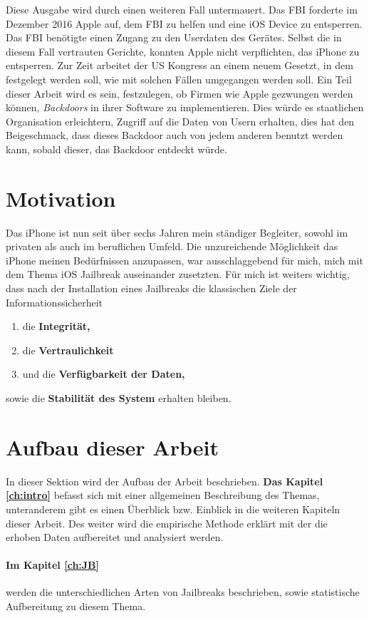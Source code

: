 Diese Ausgabe wird durch einen weiteren Fall untermauert. Das FBI forderte im Dezember 2016 Apple auf, dem FBI zu helfen und eine iOS Device zu entsperren. Das FBI benötigte einen Zugang zu den Userdaten des Gerätes. Selbst die in diesem Fall vertrauten Gerichte, konnten Apple nicht verpflichten, das iPhone zu entsperren. Zur Zeit arbeitet der US Kongress an einem neuem Gesetzt, in dem festgelegt werden soll, wie mit solchen Fällen umgegangen werden soll. Ein Teil dieser Arbeit wird es sein, festzulegen, ob Firmen wie Apple gezwungen werden können, \textit{\glqq Backdoors\grqq{}} in ihrer Software zu implementieren. Dies würde es staatlichen Organisation erleichtern, Zugriff auf die Daten von Usern erhalten, dies hat den Beigeschmack, dass dieses Backdoor auch von jedem anderen benutzt werden kann, sobald dieser, das Backdoor entdeckt würde. 

\section{Motivation }
\label{sec:IntroMotivation}
Das iPhone ist nun seit über sechs Jahren mein ständiger Begleiter, sowohl im privaten als auch im beruflichen Umfeld. Die unzureichende Möglichkeit das iPhone meinen Bedürfnissen anzupassen, war ausschlaggebend für mich, mich mit dem Thema iOS Jailbreak auseinander zusetzten. 
Für mich ist weiters wichtig, dass nach der Installation eines Jailbreaks die klassischen Ziele der Informationssicherheit
\begin{enumerate}
    \item die \textbf{Integrität,}
    \item die \textbf{Vertraulichkeit} 
    \item und die \textbf{Verfügbarkeit der Daten,}
\end{enumerate}
sowie die \textbf{Stabilität des System} erhalten bleiben.


\section{Aufbau dieser Arbeit}
\label{sec:IntroAufbau}
In dieser Sektion wird der Aufbau der Arbeit beschrieben. \textbf{Das Kapitel \ref{ch:intro}} befasst sich mit einer allgemeinen Beschreibung des Themas, unteranderem gibt es einen Überblick bzw. Einblick in die weiteren Kapiteln dieser Arbeit. Des weiter wird die empirische Methode erklärt mit der die erhoben Daten aufbereitet und analysiert werden. 

\paragraph{Im Kapitel \ref{ch:JB}} werden die unterschiedlichen Arten von Jailbreaks beschrieben, sowie statistische Aufbereitung zu diesem Thema.

